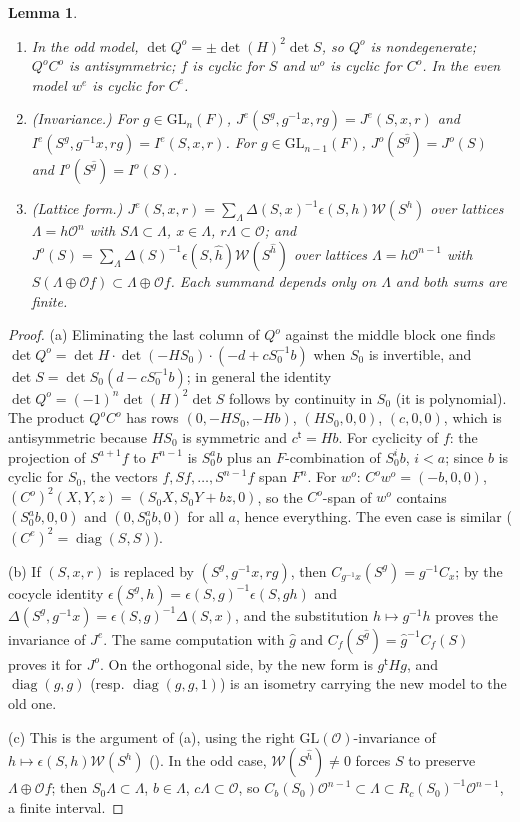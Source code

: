 \documentclass[11pt,oneside,notitlepage]{book}
\numberwithin{equation}{section}
\theoremstyle{plain}
\newtheorem{lemma}[theorem]{Lemma}
\theoremstyle{definition}
\newcommand{\cO}{\mathcal{O}}
\newcommand{\GL}{\mathrm{GL}}
\newcommand{\cW}{\mathcal{W}}
\newcommand{\diag}{\operatorname{diag}}
\begin{document}
\begin{lemma}\label{lem:models-basic}
\begin{enumerate}[label=(\alph*)]
\item In the odd model, $\det Q^o=\pm\det(H)^2\det S$, so $Q^o$ is nondegenerate; $Q^oC^o$ is antisymmetric; $f$ is cyclic for $S$ and $w^o$ is cyclic for $C^o$. In the even model $w^e$ is cyclic for $C^e$.
\item (Invariance.) For $g\in\GL_n(F)$, $J^e(S^g,g^{-1}x,rg)=J^e(S,x,r)$ and $I^e(S^g,g^{-1}x,rg)=I^e(S,x,r)$. For $g\in\GL_{n-1}(F)$, $J^o(S^{\hat g})=J^o(S)$ and $I^o(S^{\hat g})=I^o(S)$.
\item (Lattice form.) $J^e(S,x,r)=\sum_\Lambda\Delta(S,x)^{-1}\epsilon(S,h)\cW(S^h)$ over lattices $\Lambda=h\cO^n$ with $S\Lambda\subset\Lambda$, $x\in\Lambda$, $r\Lambda\subset\cO$; and $J^o(S)=\sum_\Lambda\Delta(S)^{-1}\epsilon(S,\hat h)\cW(S^{\hat h})$ over lattices $\Lambda=h\cO^{n-1}$ with $S(\Lambda\oplus\cO f)\subset\Lambda\oplus\cO f$. Each summand depends only on $\Lambda$ and both sums are finite.
\end{enumerate}
\end{lemma}
\begin{proof}
(a) Eliminating the last column of $Q^o$ against the middle block one finds $\det Q^o=\det H\cdot\det(-HS_0)\cdot(-d+cS_0^{-1}b)$ when $S_0$ is invertible, and $\det S=\det S_0(d-cS_0^{-1}b)$; in general the identity $\det Q^o=(-1)^{n}\det(H)^2\det S$ follows by continuity in $S_0$ (it is polynomial). The product $Q^oC^o$ has rows $(0,-HS_0,-Hb)$, $(HS_0,0,0)$, $(c,0,0)$, which is antisymmetric because $HS_0$ is symmetric and $c^{\mathsf t}=Hb$. For cyclicity of $f$: the projection of $S^{a+1}f$ to $F^{n-1}$ is $S_0^ab$ plus an $F$-combination of $S_0^ib$, $i<a$; since $b$ is cyclic for $S_0$, the vectors $f,Sf,\dots,S^{n-1}f$ span $F^n$. For $w^o$: $C^ow^o=(-b,0,0)$, $(C^o)^2(X,Y,z)=(S_0X,S_0Y+bz,0)$, so the $C^o$-span of $w^o$ contains $(S_0^ab,0,0)$ and $(0,S_0^ab,0)$ for all $a$, hence everything. The even case is similar ($(C^e)^2=\diag(S,S)$).

(b) If $(S,x,r)$ is replaced by $(S^g,g^{-1}x,rg)$, then $C_{g^{-1}x}(S^g)=g^{-1}C_x$; by the cocycle identity $\epsilon(S^g,h)=\epsilon(S,g)^{-1}\epsilon(S,gh)$ and $\Delta(S^g,g^{-1}x)=\epsilon(S,g)^{-1}\Delta(S,x)$, and the substitution $h\mapsto g^{-1}h$ proves the invariance of $J^e$. The same computation with $\hat g$ and $C_f(S^{\hat g})=\hat g^{-1}C_f(S)$ proves it for $J^o$. On the orthogonal side, by  the new form is $g^{\mathsf t}Hg$, and $\diag(g,g)$ (resp. $\diag(g,g,1)$) is an isometry carrying the new model to the old one.

(c) This is the argument of (a), using the right $\GL(\cO)$-invariance of $h\mapsto\epsilon(S,h)\cW(S^h)$ (). In the odd case, $\cW(S^{\hat h})\ne0$ forces $S$ to preserve $\Lambda\oplus\cO f$; then $S_0\Lambda\subset\Lambda$, $b\in\Lambda$, $c\Lambda\subset\cO$, so $C_b(S_0)\cO^{n-1}\subset\Lambda\subset R_c(S_0)^{-1}\cO^{n-1}$, a finite interval.
\end{proof}
\end{document}
